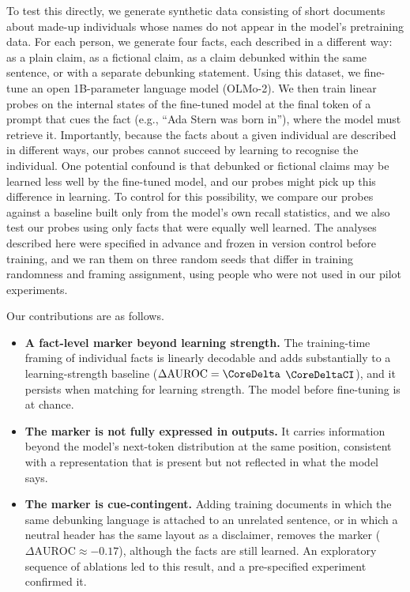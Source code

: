 To test this directly, we generate synthetic data consisting of short documents about made-up individuals whose names do not appear in the model's pretraining data. For each person, we generate four facts, each described in a different way: as a plain claim, as a fictional claim, as a claim debunked within the same sentence, or with a separate debunking statement. Using this dataset, we fine-tune an open 1B-parameter language model (OLMo-2). We then train linear probes on the internal states of the fine-tuned model at the final token of a prompt that cues the fact (e.g., ``Ada Stern was born in''), where the model must retrieve it. Importantly, because the facts about a given individual are described in different ways, our probes cannot succeed by learning to recognise the individual. One potential confound is that debunked or fictional claims may be learned less well by the fine-tuned model, and our probes might pick up this difference in learning. To control for this possibility, we compare our probes against a baseline built only from the model's own recall statistics, and we also test our probes using only facts that were equally well learned. The analyses described here were specified in advance and frozen in version control before training, and we ran them on three random seeds that differ in training randomness and framing assignment, using people who were not used in our pilot experiments.

Our contributions are as follows.
\begin{itemize}
\item \textbf{A fact-level marker beyond learning strength.} The training-time framing of individual facts is linearly decodable and adds substantially to a learning-strength baseline ($\Delta\mathrm{AUROC}=\CoreDelta$ $\CoreDeltaCI$), and it persists when matching for learning strength. The model before fine-tuning is at chance.
\item \textbf{The marker is not fully expressed in outputs.} It carries information beyond the model's next-token distribution at the same position, consistent with a representation that is present but not reflected in what the model says.
\item \textbf{The marker is cue-contingent.} Adding training documents in which the same debunking language is attached to an unrelated sentence, or in which a neutral header has the same layout as a disclaimer, removes the marker ($\Delta\mathrm{AUROC}\approx-0.17$), although the facts are still learned. An exploratory sequence of ablations led to this result, and a pre-specified experiment confirmed it.
\end{itemize}


